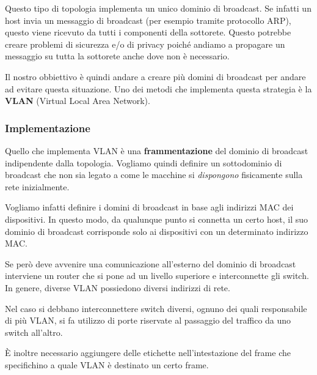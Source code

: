 Questo tipo di topologia implementa un unico dominio di broadcast. Se
infatti un host invia un messaggio di broadcast (per esempio tramite 
protocollo ARP), questo viene ricevuto da tutti i componenti della 
sottorete. Questo potrebbe creare problemi di sicurezza e/o di privacy
poiché andiamo a propagare un messaggio su tutta la sottorete anche 
dove non è necessario.

Il nostro obbiettivo è quindi andare a creare più domini di broadcast
per andare ad evitare questa situazione. Uno dei metodi che implementa
questa strategia è la \textbf{VLAN} (Virtual Local Area Network).

\subsubsection{Implementazione}
Quello che implementa VLAN è una \textbf{frammentazione} del dominio di
broadcast indipendente dalla topologia. Vogliamo quindi definire un
sottodominio di broadcast che non sia legato a come le macchine si
\emph{dispongono} fisicamente sulla rete inizialmente.

Vogliamo infatti definire i domini di broadcast in base agli indirizzi
MAC dei dispositivi. In questo modo, da qualunque punto si connetta un
certo host, il suo dominio di broadcast corrisponde solo ai dispositivi
con un determinato indirizzo MAC.

Se però deve avvenire una comunicazione all'esterno del dominio di
broadcast interviene un router che si pone ad un livello superiore e
interconnette gli switch. In genere, diverse VLAN possiedono diversi
indirizzi di rete.

Nel caso si debbano interconnettere switch diversi, ognuno dei quali
responsabile di più VLAN, si fa utilizzo di porte riservate al
passaggio del traffico da uno switch all'altro.

\`E inoltre necessario aggiungere delle etichette nell'intestazione del
frame che specifichino a quale VLAN è destinato un certo frame.
